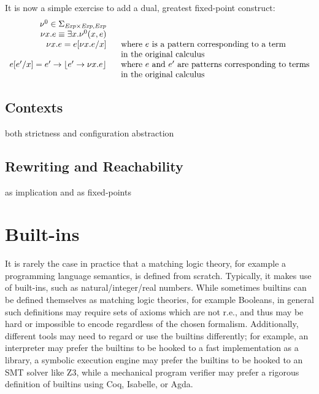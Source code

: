 \documentclass[UTF8,11pt]{article}
\theoremstyle{plain}
\theoremstyle{definition}
\theoremstyle{remark}
\DeclarePairedDelimiter{\floor}{\lfloor}{\rfloor}
\newcommand{\Exp}{\textit{Exp}}
\begin{document}
It is now a simple exercise to add a dual, greatest fixed-point construct:
$$
\begin{array}{r@{\hspace*{4ex}}l}
\nu^0 \in \Sigma_{\Exp\times\Exp,\Exp}
\\
\nu x . e \equiv \exists x . \nu^0(x,e)
\\
\nu x . e = e[\nu x.e/x]
& \textrm{where $e$ is a pattern corresponding to a term}
\\
& \textrm{in the original calculus} \\
e[e'/x] = e' \rightarrow \floor{e' \rightarrow \nu x . e}
& \textrm{where $e$ and $e'$ are patterns corresponding to terms}
\\
& \textrm{in the original calculus}
\end{array}
$$


\subsection{Contexts}

both strictness and configuration abstraction

\subsection{Rewriting and Reachability}

as implication and as fixed-points 


\section{Built-ins}
\label{sec:builtins}

It is rarely the case in practice that a matching logic theory, for example
a programming language semantics, is defined from scratch.
Typically, it makes use of built-ins, such as natural/integer/real numbers.
While sometimes builtins can be defined themselves as matching logic theories,
for example Booleans, in general such definitions may require sets of axioms
which are not r.e., and thus may be hard or impossible to encode regardless
of the chosen formalism.
Additionally, different tools may need to regard or use the builtins
differently;
for example, an interpreter may prefer the builtins to be hooked to a
fast implementation as a library, a symbolic execution engine may prefer the
builtins to be hooked to an SMT solver like Z3, while a mechanical program
verifier may prefer a rigorous definition of builtins using Coq, Isabelle,
or Agda.
\end{document}
